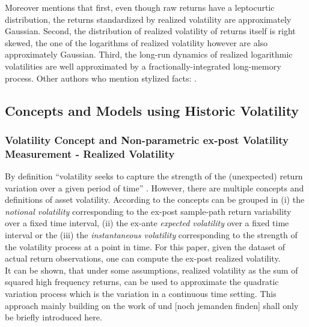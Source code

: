 Moreover \citeauthor{andersen2001} mentions that first, even though raw returns have a leptocurtic distribution, the returns standardized by realized volatility are approximately Gaussian. Second, the distribution of realized volatility of returns itself is right skewed, the one of the logarithms of realized volatility however are also approximately Gaussian. Third, the long-run dynamics of realized logarithmic volatilities are well approximated by a fractionally-integrated long-memory process. Other authors who mention stylized facts: \parencite{jiang2003}.

\subsection{Concepts and Models using Historic Volatility}
\subsubsection{Volatility Concept and Non-parametric ex-post Volatility Measurement - Realized Volatility}
By definition ``volatility seeks to capture the strength of the (unexpected) return variation over a given period of time'' \parencite[p.7]{andersen2001}. However, there are multiple concepts and definitions of asset volatility. According to \citeauthor{andersen2001} the concepts can be grouped in (i) the \emph{notional volatility} corresponding to the ex-post sample-path return variability over a fixed time interval, (ii) the ex-ante \emph{expected volatility} over a fixed time interval or the (iii) the \emph{instantaneous volatility} corresponding to the strength of the volatility process at a point in time.
For this paper, given the dataset of actual return observations, one can compute the ex-post realized volatility.\\
It can be shown, that under some assumptions, realized volatility as the sum of squared high frequency returns, can be used to approximate the quadratic variation process which is the variation in a continuous time setting. This approach mainly building on the work of \citeauthor{andersen2001} und [noch jemanden finden] shall only be briefly introduced here. \\
